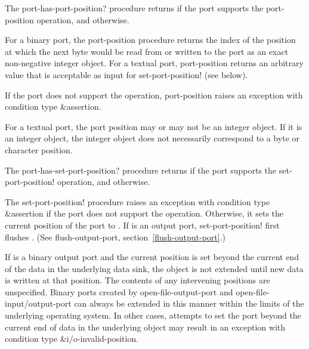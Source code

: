 \begin{entry}{%
}

The {\cf port-has-port-position?} procedure returns \schtrue{} if the
port supports the {\cf port-position} operation, and \schfalse{}
otherwise.

For a binary port, the {\cf port-position} procedure returns the index
of the position at which the next byte would be read from or written
to the port as an exact non-negative integer object.  For a textual
port, {\cf port-position} returns an arbitrary value that is
acceptable as input for {\cf set-port-position!} (see below).

If the port does not support the operation, {\cf port-position} raises
an exception with condition type {\cf\&assertion}.

\begin{note}
  For a textual port, the port position may or may not be an integer
  object.  If it is an integer object, the integer object does not
  necessarily correspond to a byte or character position.
\end{note}
\end{entry}   

\begin{entry}{%
}

   
The {\cf port-has-set-port-position?} procedure returns \schtrue{} if the port
supports the {\cf set-port-position!} operation, and \schfalse{}
otherwise.
   
The {\cf set-port-position!} procedure raises an
exception with condition type {\cf\&assertion}
if the port does not support the operation.
Otherwise, it sets the current position
of the port to .  If  is an output
port, {\cf set-port-position!} first flushes .  (See {\cf
  flush-output-port}, section~\ref{flush-output-port}.)

If  is a binary output port and the current position is set
beyond the current end of the data in the underlying data sink, the object is
not extended until new data is written at that position.
The contents of any intervening positions are unspecified.
Binary ports created by {\cf open-file-output-port} and
{\cf open-file-input/output-port} can always be extended in this manner
within the limits of the underlying operating system.
In other cases, attempts to set the port beyond the current end of data
in the underlying object may result in an exception with condition
type {\cf\&i/o-invalid-position}.
\end{entry}

